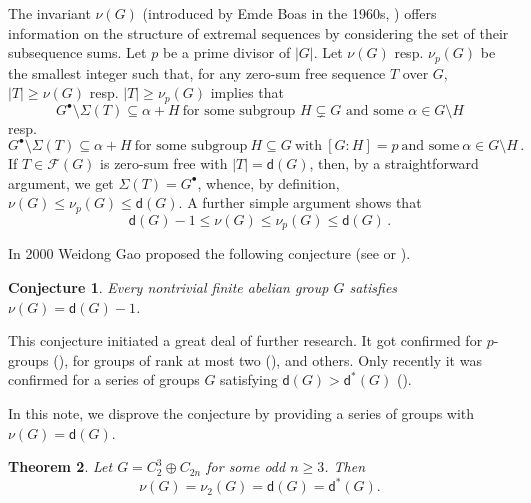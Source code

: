 \documentclass[10pt,a4paper]{amsart}
\newtheorem{theorem}{\bf Theorem}[section]
\newtheorem{conjecture}[theorem]{\bf Conjecture}
\newcommand{\dd}{\mathsf d}
\begin{document}
The invariant $\nu (G)$ (introduced by Emde Boas in the 1960s, \cite{Em69a}) offers information on the structure of extremal sequences by considering the set of their subsequence sums. Let $p$ be a prime divisor of $|G|$. Let $\nu (G)$ resp. $\nu_p (G)$ be the smallest integer such that, for any zero-sum free sequence $T$ over $G$, $|T| \ge \nu (G)$ resp. $|T| \ge \nu_p (G)$ implies that
\begin{equation} \label{def-nu(G)}
G^{\bullet} \setminus \Sigma (T) \subseteq \alpha+H \ \mbox {for some  subgroup $H  \subsetneq G$ and some $\alpha\in G\setminus H$}
\end{equation}
resp.
\begin{equation} \label{def-nu_p(G)}
G^{\bullet} \setminus \Sigma (T) \subseteq \alpha + H \ \text{for some subgroup} \ H \subseteq G \ \text{with} \ [G \colon H] = p \ \text{and some} \ \alpha \in G \setminus H \,.
\end{equation}
If $T \in \mathcal F (G)$ is zero-sum free with $|T|=\mathsf d(G)$, then, by a straightforward argument, we get $\Sigma (T) = G^{\bullet}$, whence, by definition, $\nu (G) \le \nu_p (G) \le \mathsf d (G)$. A further simple argument shows that
\begin{equation} \label{basic-inequ-2}
\mathsf d (G) -1 \le \nu (G) \le \nu_p (G) \le \mathsf d (G) \,.
\end{equation}



In 2000 Weidong Gao proposed the following conjecture (see \cite[Section~3]{Ga00b} or \cite[Conjecture~4.10]{Ga-Ge06b}).
\begin{conjecture} \label{conj:gao}
Every nontrivial finite abelian group $G$ satisfies $\nu(G)=\dd(G)-1$.
\end{conjecture}


This conjecture initiated a great deal of  further research. It got confirmed for $p$-groups (\cite[Theorem 5.5.9]{Ge-HK06a}), for  groups of rank at most two (\cite[Theorem 3.4.11]{Ge-Gr-Zh26a}), and others. Only recently it was confirmed for a series of groups $G$ satisfying $\mathsf d (G) > \mathsf d^* (G)$ (\cite{Ge-Ya27a}).


In this note, we disprove the conjecture by providing a series of groups with $\nu (G) = \mathsf d (G)$.

\begin{theorem}\label{thm:main1}
Let $G=C_2^3\oplus C_{2n}$ for some odd $n\geq 3$. Then $$\nu(G)=\nu_2 (G)=\dd(G)=\mathsf d^* (G).$$
\end{theorem}
\end{document}
